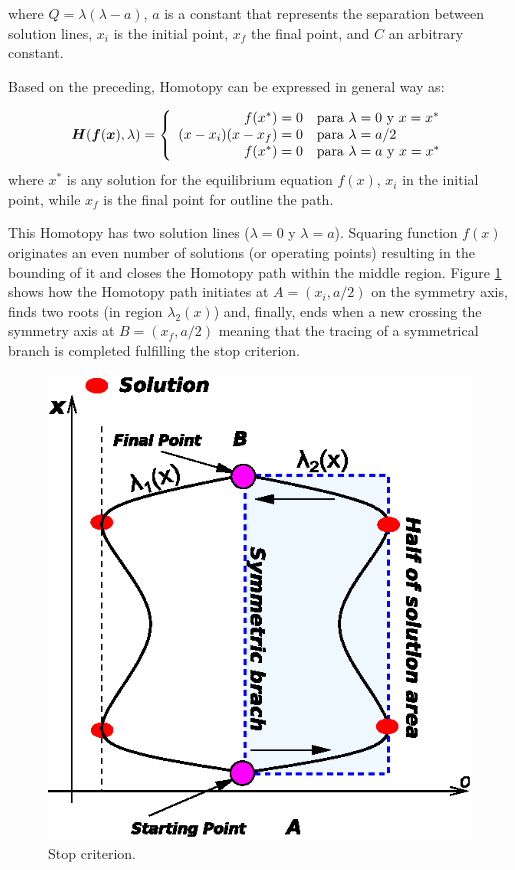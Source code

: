 \documentclass[journal,twocolumn]{IEEEtran}
\newcommand{\pig}[1]{\mbox{\boldmath ${#1}$}	}
\begin{document}
where $Q=\lambda(\lambda-a)$, $a$ is a constant that represents the separation between solution lines, $x_i$ is the initial point, $x_f$ the final point, and $C$ an arbitrary constant.

Based on the preceding, Homotopy can be expressed in general way as:

{\tiny
\begin{displaymath}
\pig{H}(\pig{f}(\pig{x}),\lambda ) = \left\{\begin{array}{rl}
f(x^*)=0 & \textrm{para $\lambda=0$ y $x=x^*$}\\
(x-x_i)(x-x_f)=0 & \textrm{para $\lambda=a/2$}\\
f(x^*)=0 & \textrm{para $\lambda=a$ y $x=x^*$}
\end{array}\right.
\end{displaymath}
}
where $x^*$ is any solution for the equilibrium equation $f(x)$, $x_i$ in the initial point, while $x_f$ is the final point for outline the path.

This Homotopy has two solution lines ($\lambda=0$ y $\lambda=a$). Squaring function $f(x)$ originates an even number of solutions (or operating points) resulting in the bounding of it and closes the Homotopy path within the middle region. Figure \ref{halftrack} shows how the Homotopy path initiates at $A=(x_i,a/2)$ on the symmetry axis, finds two roots (in region $\lambda_2(x)$) and, finally, ends when a new crossing the symmetry axis at $B=(x_f,a/2)$ meaning that the tracing of a symmetrical branch is completed fulfilling the stop criterion.

\begin{figure}[hbtp]
\centering
\includegraphics[scale=0.7]{nh3figs/dbh2.eps}
\caption{Stop criterion.}
\label{halftrack}
\end{figure}
\end{document}
